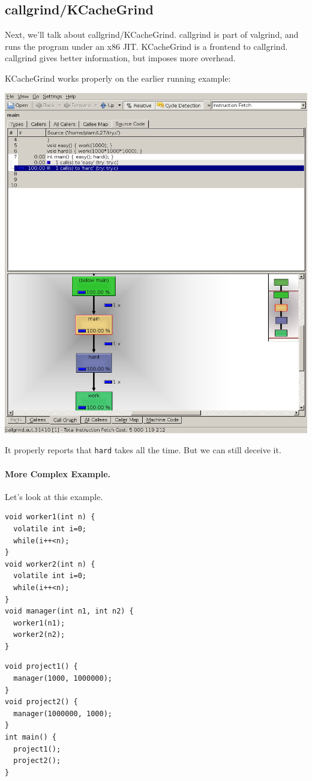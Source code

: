 \subsection*{callgrind/KCacheGrind}
Next, we'll talk about callgrind/KCacheGrind.  callgrind is part of
valgrind, and runs the program under an x86 JIT.  KCacheGrind is a
frontend to callgrind. callgrind gives better information, but imposes
more overhead.

\newpage
KCacheGrind works properly on the earlier running example:

\begin{center}
  \includegraphics[width=.4\textwidth]{images/kcachegrind}
\end{center}

It properly reports that {\tt hard} takes all the time.
But we can still deceive it.

\paragraph{More Complex Example.} Let's look at this example.

\begin{minipage}{.4\textwidth}
\begin{lstlisting}[basicstyle=\scriptsize]
void worker1(int n) {
  volatile int i=0;
  while(i++<n);
}
void worker2(int n) {
  volatile int i=0;
  while(i++<n);
}
void manager(int n1, int n2) {
  worker1(n1);
  worker2(n2);
}
\end{lstlisting}
\end{minipage}
\begin{minipage}{.4\textwidth}
\begin{lstlisting}[basicstyle=\scriptsize]
void project1() {
  manager(1000, 1000000);
}
void project2() {
  manager(1000000, 1000);
}
int main() {
  project1();
  project2();
}
\end{lstlisting}
\end{minipage}

